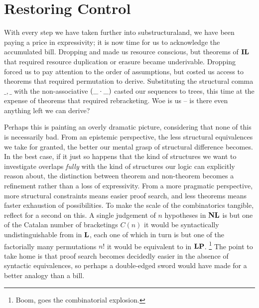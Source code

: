 
\section{Restoring Control}
With every step we have taken further into substructuraland, we have been paying a price in expressivity; it is now time for us to acknowledge the accumulated bill.
Dropping \Contraction{} and \Weakening{} made us resource conscious, but theorems of $\textbf{IL}$ that required resource duplication or erasure became underivable.
Dropping \Exchange{} forced us to pay attention to the order of assumptions, but costed us access to theorems that required permutation to derive.
Substituting the structural comma $\_,\_$ with the non-associative $(\_\cdot\_)$ casted our sequences to trees, this time at the expense of theorems that required rebracketing.
Woe is us -- is there even anything left we can derive?

Perhaps this is painting an overly dramatic picture, considering that none of this is necessarily bad.
From an epistemic perspective, the less structural equivalences we take for granted, the better our mental grasp of structural difference becomes.
In the best case, if it just so happens that the kind of structures we want to investigate overlaps \textit{fully} with the kind of structures our logic can explicitly reason about, the distinction between theorem and non-theorem becomes a refinement rather than a loss of expressivity.
From a more pragmatic perspective, more structural constraints means easier proof search, and less theorems means faster exhaustion of possibilities.
To make the scale of the combinatorics tangible, reflect for a second on this.
A single judgement of $n$ hypotheses in $\textbf{NL}$ is but one of the Catalan number of bracketings $C(n)$ it would be syntactically undistinguishable from in $\textbf{L}$, each one of which in turn is but one of the factorially many permutations $n!$ it would be equivalent to in $\textbf{LP}$.%
\footnote{Boom, goes the combinatorial explosion.}
The point to take home is that proof search becomes decidedly easier in the absence of syntactic equivalences, so perhaps a double-edged sword would have made for a better analogy than a bill.

